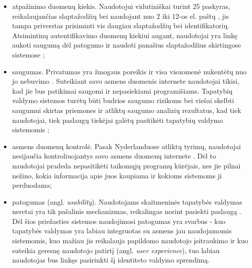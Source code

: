 

\begin{itemize}
    \item atpažinimo duomenų kiekis. Naudotojui vidutiniškai turint 25 paskyras, reikalaujančias slaptažodžių \cite{Florencio2007} bei naudojant
    nuo 2 iki 12-os el. paštų \cite{Gross2007}, jis tampa priverstas prisiminti vis daugiau slaptažodžių bei identifikatorių. Atsimintinų autentifikavimo duomenų kiekiui
    augant, naudotojai yra linkę aukoti saugumą dėl patogumo ir naudoti panašius
    slaptažodžius skirtingose sistemose \cite{Pashalidis2003, Samar1999};
    \item saugumas. Privatumas yra žmogaus poreikis ir visa visuomenė nukentėtų nuo jo nebuvimo \cite{Maliki2007}.
    Suteikiant savo asmens duomenis internete naudotojai tikisi, kad jie bus patikimai
    saugomi ir nepasiekiami programišiams. Tapatybių valdymo sistemos turėtų būti budrios saugumo rizikoms bei viešai skelbti
    saugumui skirtas priemones ir atliktų saugumo analizių rezultatus, kad tiek naudotojai, tiek paslaugų tiekėjai
    galėtų pasitikėti tapatybių valdymo sistemomis \cite{Dhamija2008};
    \item asmens duomenų kontrolė. Pasak Nyderlanduose atliktų tyrimų, naudotojai nesijaučia kontroliuojantys savo asmens duomenų internete \cite{Baars2016}. Dėl to
    naudotojai pradeda nepasitikėti taikomųjų programų kūrėjais, nes jie pilnai nežino, kokia informacija apie juos kaupiama ir kokioms
    sistemoms ji perduodama;
    \item patogumas (angl. \textit{usability}). Naudotojams skaitmeninės tapatybės valdymas neretai yra tik pašalinis mechanizmas, reikalingas
    norint pasiekti paslaugą \cite{Dhamija2008}. Dėl šios priežasties sistemos naudojimosi patogumas yra svarbus - kuo tapatybės valdymas yra labiau integruotas
    su asmens jau naudojamomis sistemomis, kuo mažiau jis reikalauja papildomo naudotojo įsitraukimo ir kuo suteikia geresnę naudotojo patirtį (angl. \textit{user experience}), tuo labiau naudotojas bus linkęs pasirinkti šį identiteto valdymo sprendimą.
\end{itemize}

